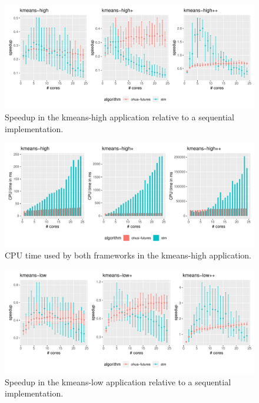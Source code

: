 \begin{figure}
    \centering
    \includegraphics[width=\textwidth,keepaspectratio]{gfx/results/kmeans-high_comb}
    \caption{Speedup in the kmeans-high application relative to a sequential implementation.}%
    \label{fig:evaluation:kmeans-high}
\end{figure}

\begin{figure}
    \centering
    \includegraphics[width=\textwidth,keepaspectratio]{gfx/results/cpu_kmeans-high_comb}
    \caption{CPU time used by both frameworks in the kmeans-high application.}%
    \label{fig:evaluation:kmeans-high-cpu}
\end{figure}

\begin{figure}
    \centering
    \includegraphics[width=\textwidth,keepaspectratio]{gfx/results/kmeans-low_comb}
    \caption{Speedup in the kmeans-low application relative to a sequential implementation.}%
    \label{fig:evaluation:kmeans-low}
\end{figure}

